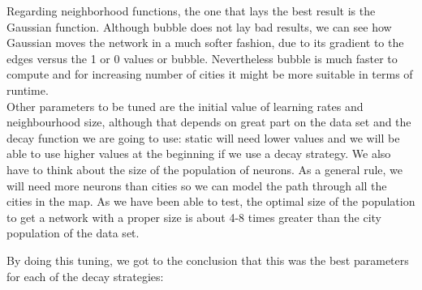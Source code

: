 \documentclass[11pt]{article}
\begin{document}
Regarding neighborhood functions, the one that lays the best result is the
Gaussian function. Although bubble does not lay bad results, we can see how
Gaussian moves the network in a much softer fashion, due to its gradient to the
edges versus the 1 or 0 values or bubble. Nevertheless bubble is much faster to
compute and for increasing number of cities it might be more suitable in terms
of runtime.\\

Other parameters to be tuned are the initial value of learning rates and
neighbourhood size, although that depends on great part on the data set and the
decay function we are going to use: static will need lower values and we will be
able to use higher values at the beginning if we use a decay strategy. We also
have to think about the size of the population of neurons. As a general rule, we
will need more neurons than cities so we can model the path through all the
cities in the map. As we have been able to test, the optimal size of the
population to get a network with a proper size is about 4-8 times greater than
the city population of the data set.\\

\newpage

By doing this tuning, we got to the conclusion that this was the best parameters
for each of the decay strategies:
\end{document}

